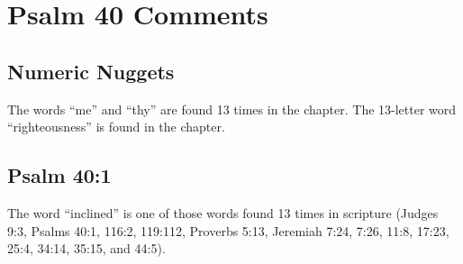 \section{Psalm 40 Comments}

\subsection{Numeric Nuggets}
The words ``me'' and ``thy'' are found 13 times in the chapter. The 13-letter word ``righteousness'' is found in the chapter.

\subsection{Psalm 40:1}
The word ``inclined'' is one of those words found 13 times in scripture (Judges 9:3, Psalms 40:1, 116:2, 119:112, Proverbs 5:13, Jeremiah 7:24, 7:26, 11:8, 17:23, 25:4, 34:14, 35:15, and 44:5). 
